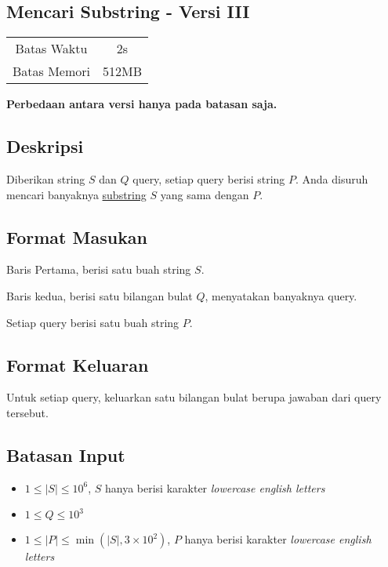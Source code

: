 \documentclass{article}
\begin{document}
\begin{center}
    \section*{Mencari Substring - Versi III} %

    \begin{tabular}{ | c c | }
        \hline
        Batas Waktu  & 2s \\    %
        Batas Memori & 512MB \\  %
        \hline
    \end{tabular}
\end{center}

\begin{center}
    \textbf{Perbedaan antara versi hanya pada batasan saja.}
\end{center}

\subsection*{Deskripsi}

Diberikan string $S$ dan $Q$ query, setiap query berisi string $P$. Anda disuruh mencari banyaknya \href{https://en.wikipedia.org/wiki/Substring}{substring} $S$ yang sama dengan $P$.

\subsection*{Format Masukan}
Baris Pertama, berisi satu buah string $S$.

Baris kedua, berisi satu bilangan bulat $Q$, menyatakan banyaknya query.

Setiap query berisi satu buah string $P$.

\subsection*{Format Keluaran}
Untuk setiap query, keluarkan satu bilangan bulat berupa jawaban dari query tersebut.

\subsection*{Batasan Input}

\begin{itemize}
    \item{$1 \leq |S| \leq 10^6$, $S$ hanya berisi karakter \textit{lowercase english letters}}
    \item{$1 \leq Q \leq 10^3$}
    \item{$1 \leq |P| \leq \min(|S|, 3 \times 10^2)$, $P$ hanya berisi karakter \textit{lowercase english letters}}
\end{itemize}
\end{document}

